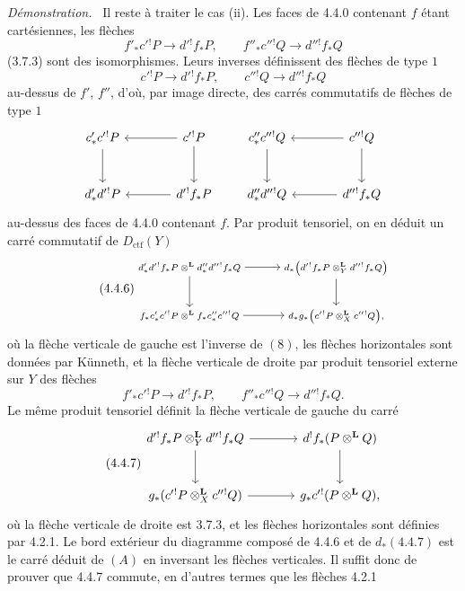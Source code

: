 \documentclass[11pt]{article}
\newenvironment{prooftext}[1][Proof]{\par\noindent\emph{#1.}\ }{\par\medskip}
\providecommand{\Dctf}{D_{\mathrm{ctf}}}
\providecommand{\Dctf}{D_{\mathrm{ctf}}}
\begin{document}
\begin{prooftext}[Démonstration]
Il reste à traiter le cas (ii). Les faces de 4.4.0 contenant $f$ étant cartésiennes, les flèches
\[
f'_*c'{}^!P\longrightarrow d'{}^!f_*P,\qquad
f''_*c''{}^!Q\longrightarrow d''{}^!f_*Q
\]
(3.7.3) sont des isomorphismes. Leurs inverses définissent des flèches de type $1$
\[
c'{}^!P\longrightarrow d'{}^!f_*P,\qquad
c''{}^!Q\longrightarrow d''{}^!f_*Q
\]
au-dessus de $f'$, $f''$, d'où, par image directe, des carrés commutatifs de flèches de type $1$
\[
\begin{tikzcd}[column sep=large,row sep=large]
c'_*c'{}^!P \arrow[d] & c'{}^!P\arrow[l]\arrow[d]\\
d'_*d'{}^!P & d'{}^!f_*P\arrow[l]
\end{tikzcd}
\qquad
\begin{tikzcd}[column sep=large,row sep=large]
c''_*c''{}^!Q \arrow[d] & c''{}^!Q\arrow[l]\arrow[d]\\
d''_*d''{}^!Q & d''{}^!f_*Q\arrow[l]
\end{tikzcd}
\]
au-dessus des faces de 4.4.0 contenant $f$. Par produit tensoriel, on en déduit un carré commutatif de $\Dctf(Y)$
\begin{equation}
\tag{4.4.6}
{\scriptsize
\begin{tikzcd}[column sep=large,row sep=large]
d'_*d'{}^!f_*P\otimes^{\mathbf L}d''_*d''{}^!f_*Q
 \arrow[r]\arrow[d] &
d_*\bigl(d'{}^!f_*P\otimes_Y^{\mathbf L}d''{}^!f_*Q\bigr)\arrow[d]\\
f_*c'_*c'{}^!P\otimes^{\mathbf L}f_*c''_*c''{}^!Q
 \arrow[r] &
d_*g_*\bigl(c'{}^!P\otimes_X^{\mathbf L}c''{}^!Q\bigr),
\end{tikzcd}
}
\end{equation}
où la flèche verticale de gauche est l'inverse de $(8)$, les flèches horizontales sont données par Künneth, et la flèche verticale de droite par produit tensoriel externe sur $Y$ des flèches
\[
f'_*c'{}^!P\longrightarrow d'{}^!f_*P,\qquad
f''_*c''{}^!Q\longrightarrow d''{}^!f_*Q.
\]
Le même produit tensoriel définit la flèche verticale de gauche du carré
\begin{equation}
\tag{4.4.7}
\begin{tikzcd}[column sep=large,row sep=large]
d'{}^!f_*P\otimes_Y^{\mathbf L}d''{}^!f_*Q
 \arrow[r]\arrow[d] &
d^!f_*(P\otimes^{\mathbf L}Q)\arrow[d]\\
g_*(c'{}^!P\otimes_X^{\mathbf L}c''{}^!Q)
 \arrow[r] &
g_*c'{}^!(P\otimes^{\mathbf L}Q),
\end{tikzcd}
\end{equation}
où la flèche verticale de droite est 3.7.3, et les flèches horizontales sont définies par 4.2.1. Le bord extérieur du diagramme composé de 4.4.6 et de $d_*(4.4.7)$ est le carré déduit de $(A)$ en inversant les flèches verticales. Il suffit donc de prouver que 4.4.7 commute, en d'autres termes que les flèches 4.2.1

\end{prooftext}
\end{document}
